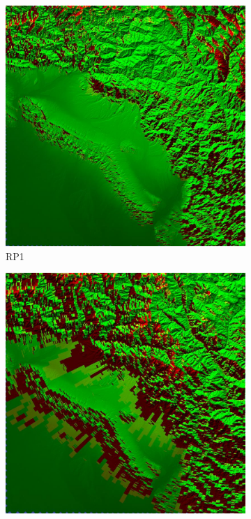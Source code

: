 \begin{figure}[H]
\centering
        \begin{subfigure}[b]{0.45\textwidth}
            \centering
            \includegraphics[width=\textwidth]{Images/RP1 Coverage.jpg}
            \caption{\small RP1}    
            \label{fig:RP1}
        \end{subfigure}
        \hfill
        \begin{subfigure}[b]{0.45\textwidth}
            \centering
            \includegraphics[width=\textwidth]{Images/RP2 Coverage.jpg}

\end{subfigure}
\end{figure}
